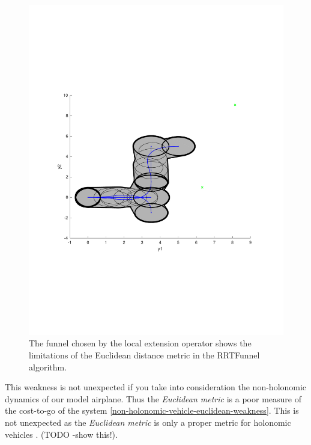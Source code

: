 \begin{figure}
\includegraphics[scale=.5]{figures/rrtfunnel/euclidean-distance-closest-funnel4}
\caption{The funnel chosen by the local extension operator shows the limitations
of the Euclidean distance metric in the RRTFunnel algorithm.}
\end{figure}

This weakness is not unexpected if you take into consideration the non-holonomic
dynamics of our model airplane. Thus the \textit{Euclidean metric} is a poor
measure of the cost-to-go of the system
\ref{non-holonomic-vehicle-euclidean-weakness}. This is not unexpected as
the \textit{Euclidean metric} is only a proper metric for holonomic vehicles \cite{parkFeedbackMotionPlanning2015}.
(TODO -show this!).


